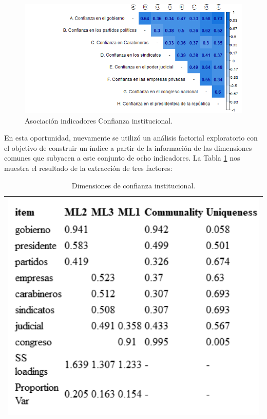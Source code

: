 \documentclass[
  12pt,
]{book}
\begin{document}
\begin{figure}[H]

{\centering \includegraphics[width=1\linewidth,height=1\textheight]{output/graphs/confianza-institucional_cor} 

}

\caption{Asociación indicadores Confianza institucional.}\label{fig:confianza-institucional-cor}
\end{figure}

En esta oportunidad, nuevamente se utilizó un análisis factorial exploratorio con el objetivo de construir un índice a partir de la información de las dimensiones comunes que subyacen a este conjunto de ocho indicadores. La Tabla \ref{tab:inst-fa} nos muestra el resultado de la extracción de tres factores:

\begin{longtable}[]{@{}l@{}}
\caption{\label{tab:inst-fa}Dimensiones de confianza institucional.}\tabularnewline
\toprule
\endhead
\includegraphics[width=5.20833in,height=\textheight]{output/tables/inst_fa.png} \\
\bottomrule
\end{longtable}
\end{document}
